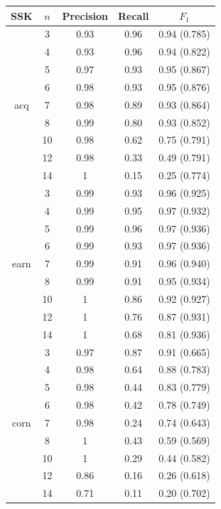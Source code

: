 \begin{table}
	\centering
	\small
	
	\begin{tabular}{| c | c | c | c | c | }
		\hline SSK& $ n $ & Precision & Recall & $ F_1 $   \\ \hline
		
		& 3 & 0.93 & 0.96 & 0.94 (0.785)    \\ 
		& 4 & 0.93 & 0.96 &  0.94  (0.822)  \\
		& 5 & 0.97 & 0.93 & 0.95  (0.867)   \\ 
		& 6 & 0.98 & 0.93 & 0.95 (0.876)    \\
		acq	& 7 & 0.98 & 0.89 & 0.93 (0.864)    \\
		& 8 & 0.99 & 0.80 & 0.93  (0.852)   \\
		& 10 & 0.98 & 0.62 & 0.75  (0.791)   \\
		& 12 & 0.98 & 0.33 & 0.49  (0.791)   \\
		& 14 & 1 & 0.15 & 0.25  (0.774)   \\ \hline
		
		
		
		& 3 & 0.99 & 0.93 & 0.96  (0.925)   \\ 
		& 4 & 0.99 & 0.95 &  0.97  (0.932) \\
		& 5 & 0.99 & 0.96 & 0.97   (0.936)  \\ 
		& 6 & 0.99 & 0.93 & 0.97  (0.936)   \\
		earn& 7 & 0.99 & 0.91 & 0.96 (0.940)    \\
		& 8 & 0.99 & 0.91 & 0.95  (0.934)   \\
		& 10 & 1 & 0.86 & 0.92  (0.927)   \\
		& 12 & 1 & 0.76 & 0.87  (0.931)   \\
		& 14 & 1 & 0.68 & 0.81  (0.936)   \\ \hline
		
		
		& 3 & 0.97 & 0.87 & 0.91  (0.665)   \\ 
		& 4 & 0.98 & 0.64 & 0.88  (0.783)   \\ 
		& 5 & 0.98 & 0.44 &  0.83  (0.779)  \\ 
		& 6 & 0.98 & 0.42 & 0.78   (0.749)  \\ 
		corn& 7 & 0.98 & 0.24 & 0.74  (0.643)  \\ 
		& 8 & 1 & 0.43& 0.59  (0.569)   \\ 
		& 10 & 1 & 0.29& 0.44  (0.582)   \\ 
		& 12 & 0.86 & 0.16& 0.26  (0.618)   \\ 
		& 14 & 0.71 & 0.11& 0.20  (0.702)   \\ 
		\hline
		

\end{tabular}
\end{table}

